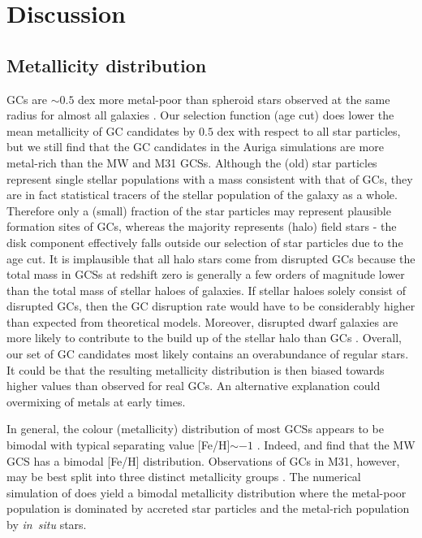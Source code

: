 \documentclass[a4paper,fleqn,usenatbib]{mnras}
\begin{document}
\section{Discussion}
\label{sec:discussion}
\subsection{Metallicity distribution}
\label{sec:discussion_FeH}
GCs are ${\sim}0.5$ dex more metal-poor than spheroid stars observed 
at the same radius for almost all galaxies \citep{1991ARA&A..29..543H}. Our 
selection function (age cut) does lower the mean metallicity of GC candidates by 
$0.5$ dex with respect to all star particles, but we still find that the GC 
candidates in the Auriga simulations are more metal-rich than the MW and M31 GCSs. 
Although the (old) star particles represent single stellar populations with a mass 
consistent with that of GCs, they are in fact statistical tracers 
of the stellar population of the galaxy as a whole. Therefore only a (small) 
fraction of the star particles may represent plausible formation sites of GCs, 
whereas the majority represents (halo) field stars - the disk component effectively 
falls outside our selection of star particles due to the age cut. It is implausible 
that all halo stars come from disrupted GCs because the total mass in GCSs 
at redshift zero is generally a few orders of magnitude lower than the total 
mass of stellar haloes of galaxies. If stellar haloes solely consist of disrupted
GCs, then the GC disruption rate would have to be considerably higher than expected
from theoretical models. Moreover, disrupted dwarf galaxies are more likely to 
contribute to the build up of the stellar halo than GCs \citep[e.g.][]{2015MNRAS.448L..77D, 
2019ApJ...887..237C}. Overall, our set of GC candidates most likely contains
an overabundance of regular stars. It could be that the resulting metallicity
distribution is then biased towards higher values than observed for real 
GCs. An alternative explanation could overmixing of metals at early times.


In general, the colour (metallicity) distribution of most GCSs appears to be bimodal 
with typical separating value [Fe/H]$\sim -1$ \citep{1985ApJ...293..424Z,
1999AJ....118.1526G,2001AJ....121.2974L,2006ApJ...639...95P}. Indeed, 
\citet{1998gcs..book.....A} and \citet{Harris2001} find that the MW GCS has a 
bimodal [Fe/H] distribution. Observations of GCs in M31, however, may be best 
split into three distinct metallicity groups \citep{2016ApJ...824...42C}. The 
numerical simulation of \citet{2017MNRAS.465.3622R} does yield a bimodal 
metallicity distribution where the metal-poor population is dominated by accreted 
star particles and the metal-rich population by {\it in~situ} stars. 
\end{document}
